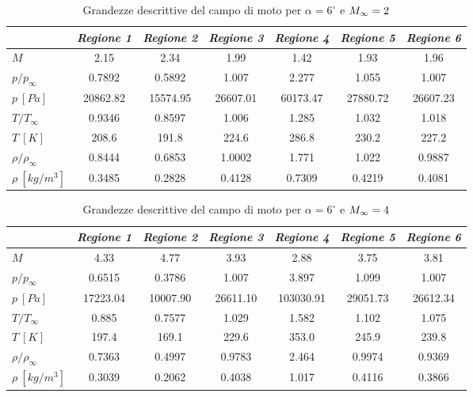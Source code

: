 \begin{table} [H]
	\centering 
	\begin{tabular}{l  c  c c c c c}   
		\toprule&   
		\emph{Regione 1}& \emph{Regione 2}& \emph{Regione 3}& \emph{Regione 4}& \emph{Regione 5}& \emph{Regione 6}   \\  \midrule
		$M$ &2.15 &2.34 &1.99 &1.42 &1.93 &1.96 \\
		$p/p_{\infty}$   &  0.7892   &  0.5892   &  1.007   &  2.277   &  1.055   &  1.007 \\
		$p \ [\si{Pa}]$  & 20862.82  & 15574.95  & 26607.01  & 60173.47  & 27880.72  & 26607.23 \\
		$T/T_{\infty}$  & 0.9346 & 0.8597 & 1.006 & 1.285 & 1.032 & 1.018\\
		$T \ [\si{K}]$  & 208.6 & 191.8 & 224.6 & 286.8 & 230.2 & 227.2\\
		$\rho/\rho_{\infty}$  & 0.8444 & 0.6853 & 1.0002 & 1.771 & 1.022&0.9887\\
		$\rho \ [\si{kg/m^3}]$ & 0.3485 & 0.2828 & 0.4128 & 0.7309 & 0.4219 & 0.4081\\
		\bottomrule
	\end{tabular}
	\caption {\footnotesize Grandezze descrittive del campo di moto per $\alpha=6^\circ$ e $M_ {\infty}=2$}\label{tabS6}
\end{table}			

\begin{table} [H]
	\centering {}
	\begin{tabular}{l  c  c c c c c}   
		\toprule&    
		\emph{Regione 1}& \emph{Regione 2}& \emph{Regione 3}& \emph{Regione 4}& \emph{Regione 5}& \emph{Regione 6}   \\  \midrule
		$M$ &4.33 &4.77 &3.93 &2.88 &3.75 &3.81 \\
		$p/p_{\infty}$ &0.6515 &0.3786 &1.007 &3.897 &1.099 &1.007 \\
		$p \ [\si{Pa}]$  & 17223.04  & 10007.90  & 26611.10  & 103030.91  & 29051.73  & 26612.34 \\
		$T/T_{\infty}$  & 0.885 & 0.7577 & 1.029 & 1.582 & 1.102 & 1.075\\
		$T \ [\si{K}]$  & 197.4 & 169.1 & 229.6 & 353.0 & 245.9 & 239.8\\
		$\rho/\rho_{\infty}$  & 0.7363 & 0.4997 & 0.9783 & 2.464 & 0.9974 & 0.9369\\
		$\rho \ [\si{kg/m^3}]$  & 0.3039 & 0.2062 & 0.4038 & 1.017 & 0.4116 & 0.3866\\
		\bottomrule
	\end{tabular}
	\caption {\footnotesize Grandezze descrittive del campo di moto per $\alpha=6^\circ$ e $M_ {\infty}=4$}\label{tabS7}\end{table}				

